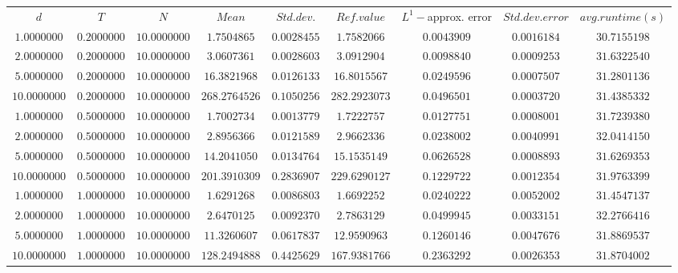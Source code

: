 \begin{tabular}{ccccccccc}
$d$ & $T$ & $N$ & $Mean$ & $Std. dev.$ & $Ref. value$ & $L^1-$approx. error & $Std. dev. error$ & $avg. runtime (s)$\\
$1.0000000$ & $0.2000000$ & $10.0000000$ & $1.7504865$ & $0.0028455$ & $1.7582066$ & $0.0043909$ & $0.0016184$ & $30.7155198$\\
$2.0000000$ & $0.2000000$ & $10.0000000$ & $3.0607361$ & $0.0028603$ & $3.0912904$ & $0.0098840$ & $0.0009253$ & $31.6322540$\\
$5.0000000$ & $0.2000000$ & $10.0000000$ & $16.3821968$ & $0.0126133$ & $16.8015567$ & $0.0249596$ & $0.0007507$ & $31.2801136$\\
$10.0000000$ & $0.2000000$ & $10.0000000$ & $268.2764526$ & $0.1050256$ & $282.2923073$ & $0.0496501$ & $0.0003720$ & $31.4385332$\\
$1.0000000$ & $0.5000000$ & $10.0000000$ & $1.7002734$ & $0.0013779$ & $1.7222757$ & $0.0127751$ & $0.0008001$ & $31.7239380$\\
$2.0000000$ & $0.5000000$ & $10.0000000$ & $2.8956366$ & $0.0121589$ & $2.9662336$ & $0.0238002$ & $0.0040991$ & $32.0414150$\\
$5.0000000$ & $0.5000000$ & $10.0000000$ & $14.2041050$ & $0.0134764$ & $15.1535149$ & $0.0626528$ & $0.0008893$ & $31.6269353$\\
$10.0000000$ & $0.5000000$ & $10.0000000$ & $201.3910309$ & $0.2836907$ & $229.6290127$ & $0.1229722$ & $0.0012354$ & $31.9763399$\\
$1.0000000$ & $1.0000000$ & $10.0000000$ & $1.6291268$ & $0.0086803$ & $1.6692252$ & $0.0240222$ & $0.0052002$ & $31.4547137$\\
$2.0000000$ & $1.0000000$ & $10.0000000$ & $2.6470125$ & $0.0092370$ & $2.7863129$ & $0.0499945$ & $0.0033151$ & $32.2766416$\\
$5.0000000$ & $1.0000000$ & $10.0000000$ & $11.3260607$ & $0.0617837$ & $12.9590963$ & $0.1260146$ & $0.0047676$ & $31.8869537$\\
$10.0000000$ & $1.0000000$ & $10.0000000$ & $128.2494888$ & $0.4425629$ & $167.9381766$ & $0.2363292$ & $0.0026353$ & $31.8704002$\\
\end{tabular}
